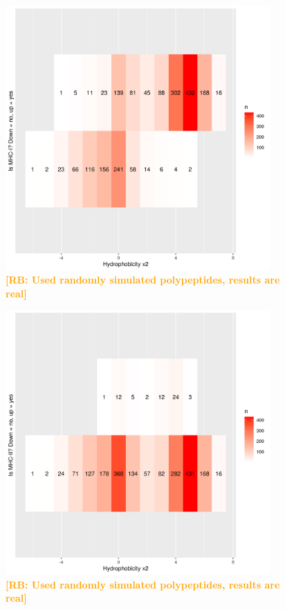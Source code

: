 \documentclass{article}
\newcommand{\richel}[1]{\textcolor{orange}{\textbf{[RB: #1]}}}
\begin{document}
\begin{figure}[!htbp]
  \includegraphics[width=0.9\textwidth]{p_bind_per_hydrophobicity/hydrophobicity_vs_binds_mhc1.png}
  \caption{
    \richel{Used randomly simulated polypeptides, results are real}
  }
  \label{fig:hydrophobicity_vs_binds_mhc1}
\end{figure}

\begin{figure}[!htbp]
  \includegraphics[width=0.9\textwidth]{p_bind_per_hydrophobicity/hydrophobicity_vs_binds_mhc2.png}
  \caption{
    \richel{Used randomly simulated polypeptides, results are real}
  }
  \label{fig:hydrophobicity_vs_binds_mhc2}
\end{figure}
\end{document}

